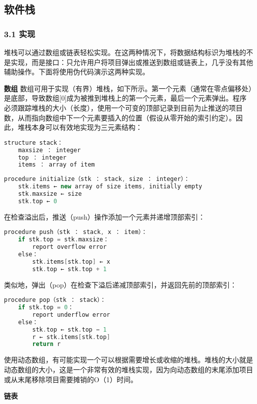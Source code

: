 \subsection{软件栈}
\subsubsection{3.1 实现}
堆栈可以通过数组或链表轻松实现。在这两种情况下，将数据结构标识为堆栈的不是实现，而是接口：只允许用户将项目弹出或推送到数组或链表上，几乎没有其他辅助操作。下面将使用伪代码演示这两种实现。

\textbf{数组}
数组可用于实现（有界）堆栈，如下所示。第一个元素（通常在零点偏移处）是底部，导致数组[0]成为被推到堆栈上的第一个元素，最后一个元素弹出。程序必须跟踪堆栈的大小（长度），使用一个可变的顶部记录到目前为止推送的项目数，从而指向数组中下一个元素要插入的位置（假设从零开始的索引约定）。因此，堆栈本身可以有效地实现为三元素结构：
\begin{lstlisting}[language=cpp]
structure stack：
    maxsize ： integer
    top ： integer
    items ： array of item
\end{lstlisting}

\begin{lstlisting}[language=cpp]
procedure initialize（stk ： stack, size ： integer）：
    stk.items ← new array of size items, initially empty
    stk.maxsize ← size
    stk.top ← 0
\end{lstlisting}
在检查溢出后，推送（push）操作添加一个元素并递增顶部索引：
\begin{lstlisting}[language=cpp]
procedure push（stk ： stack, x ： item）：
    if stk.top = stk.maxsize：
        report overflow error
    else：
        stk.items[stk.top] ← x
        stk.top ← stk.top + 1
\end{lstlisting}
类似地，弹出（pop）在检查下溢后递减顶部索引，并返回先前的顶部索引：
\begin{lstlisting}[language=cpp]
procedure pop（stk ： stack）：
    if stk.top = 0：
        report underflow error
    else：
        stk.top ← stk.top − 1
        r ← stk.items[stk.top]
        return r
\end{lstlisting}
使用动态数组，有可能实现一个可以根据需要增长或收缩的堆栈。堆栈的大小就是动态数组的大小，这是一个非常有效的堆栈实现，因为向动态数组的末尾添加项目或从末尾移除项目需要摊销的O（1）时间。

\textbf{链表}

